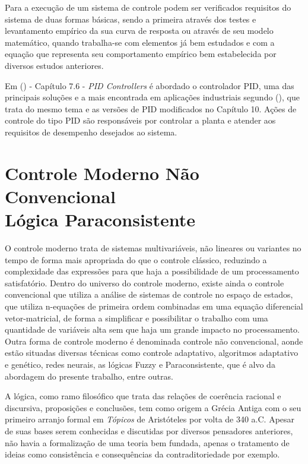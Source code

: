 Para a execução de um sistema de controle podem ser verificados requisitos do sistema de duas formas básicas, 
sendo a primeira através dos testes e levantamento empírico da sua curva de resposta ou através de seu modelo matemático, 
quando trabalha-se com elementos já bem estudados e com a equação que representa seu comportamento empírico bem estabelecida por diversos estudos anteriores.


Em \citeauthor{dorf2011modern}(\citeyear{dorf2011modern}) - 
Capítulo 7.6 - \emph{PID Controllers} 
é abordado o controlador PID, 
uma das principais soluções e a mais encontrada em aplicações industriais segundo \citeauthor{Ogata}(\citeyear{Ogata}), 
que trata do mesmo tema e as versões de PID modificados no Capítulo 10. 
Ações de controle do tipo PID são responsáveis por controlar a planta e atender aos requisitos de desempenho desejados ao sistema.





\newpage





\section{Controle Moderno Não Convencional \\ Lógica Paraconsistente}

O controle moderno trata de sistemas multivariáveis, não lineares ou variantes no tempo de forma mais apropriada do que o controle clássico, reduzindo a complexidade das expressões para que haja a possibilidade de um processamento satisfatório.
Dentro do universo do controle moderno, existe ainda o controle convencional que utiliza a análise de sistemas de controle no espaço de estados, que utiliza n-equações de primeira ordem combinadas em uma equação diferencial vetor-matricial, de forma a simplificar e possibilitar o trabalho com uma quantidade de variáveis alta sem que haja um grande impacto no processamento.  \cite{Ogata} 
Outra forma de controle moderno é denominada controle não convencional, aonde estão situadas diversas técnicas como controle adaptativo, algoritmos adaptativo e genético, redes neurais, as lógicas Fuzzy e Paraconsistente, que é alvo da abordagem do presente trabalho, entre outras.

A lógica, como ramo filosófico que trata das relações de coerência racional e discursiva, proposições e conclusões, tem como origem a Grécia Antiga com o seu primeiro arranjo formal em \emph{Tópicos} de Aristóteles por volta de 340 a.C. Apesar de suas bases serem conhecidas e discutidas por diversos pensadores anteriores, não havia a formalização de uma teoria bem fundada, apenas o tratamento de ideias como consistência e consequências da contraditoriedade por exemplo. 

